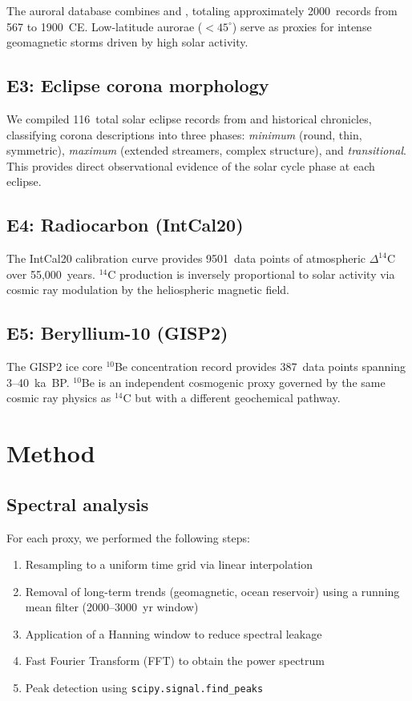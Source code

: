 \documentclass[twocolumn,preprintnumbers,amsmath,amssymb]{revtex4-2}
\begin{document}
The auroral database combines \citet{Silverman1992} and \citet{Keimatsu1970}, totaling approximately 2000~records from 567 to 1900~CE. Low-latitude aurorae ($< 45^\circ$) serve as proxies for intense geomagnetic storms driven by high solar activity.

\subsection{E3: Eclipse corona morphology}

We compiled 116~total solar eclipse records from \citet{Stephenson1997} and historical chronicles, classifying corona descriptions into three phases: \textit{minimum} (round, thin, symmetric), \textit{maximum} (extended streamers, complex structure), and \textit{transitional}. This provides direct observational evidence of the solar cycle phase at each eclipse.

\subsection{E4: Radiocarbon (IntCal20)}

The IntCal20 calibration curve \citep{Reimer2020} provides 9501~data points of atmospheric $\Delta^{14}$C over 55,000~years. $^{14}$C production is inversely proportional to solar activity via cosmic ray modulation by the heliospheric magnetic field.

\subsection{E5: Beryllium-10 (GISP2)}

The GISP2 ice core $^{10}$Be concentration record \citep{Finkel1997} provides 387~data points spanning 3--40~ka~BP. $^{10}$Be is an independent cosmogenic proxy governed by the same cosmic ray physics as $^{14}$C but with a different geochemical pathway.

\section{Method}
\label{sec:method}

\subsection{Spectral analysis}

For each proxy, we performed the following steps:
\begin{enumerate}
    \item Resampling to a uniform time grid via linear interpolation
    \item Removal of long-term trends (geomagnetic, ocean reservoir) using a running mean filter (2000--3000~yr window)
    \item Application of a Hanning window to reduce spectral leakage
    \item Fast Fourier Transform (FFT) to obtain the power spectrum
    \item Peak detection using \texttt{scipy.signal.find\_peaks}
\end{enumerate}
\end{document}
